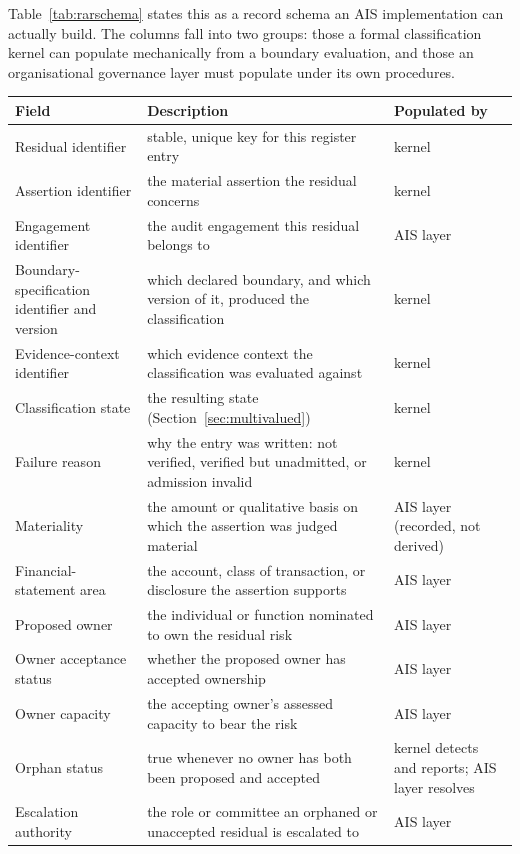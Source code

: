 \documentclass[11pt,a4paper]{article}
\theoremstyle{definition}
\theoremstyle{remark}
\begin{document}
Table~\ref{tab:rarschema} states this as a record schema an AIS implementation can actually build. The columns fall into two groups: those a formal classification kernel can populate mechanically from a boundary evaluation, and those an organisational governance layer must populate under its own procedures.

\begin{table}[htbp]
\centering
\small
\begin{tabular}{>{\raggedright\arraybackslash}p{3.6cm}>{\raggedright\arraybackslash}p{5.4cm}>{\raggedright\arraybackslash}p{2.6cm}}
\toprule
\textbf{Field} & \textbf{Description} & \textbf{Populated by} \\
\midrule
Residual identifier & stable, unique key for this register entry & kernel \\
Assertion identifier & the material assertion the residual concerns & kernel \\
Engagement identifier & the audit engagement this residual belongs to & AIS layer \\
Boundary-specification identifier and version & which declared boundary, and which version of it, produced the classification & kernel \\
Evidence-context identifier & which evidence context the classification was evaluated against & kernel \\
Classification state & the resulting state (Section~\ref{sec:multivalued}) & kernel \\
Failure reason & why the entry was written: not verified, verified but unadmitted, or admission invalid & kernel \\
Materiality & the amount or qualitative basis on which the assertion was judged material & AIS layer (recorded, not derived) \\
Financial-statement area & the account, class of transaction, or disclosure the assertion supports & AIS layer \\
Proposed owner & the individual or function nominated to own the residual risk & AIS layer \\
Owner acceptance status & whether the proposed owner has accepted ownership & AIS layer \\
Owner capacity & the accepting owner's assessed capacity to bear the risk & AIS layer \\
Orphan status & true whenever no owner has both been proposed and accepted & kernel detects and reports; AIS layer resolves \\
Escalation authority & the role or committee an orphaned or unaccepted residual is escalated to & AIS layer \\

\end{tabular}
\end{table}
\end{document}
